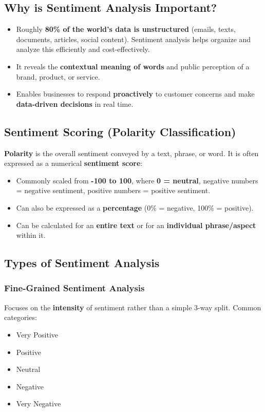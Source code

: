 \documentclass[12pt,openany]{book}
\begin{document}
\subsection{Why is Sentiment Analysis Important?}

\begin{itemize}[leftmargin=*]
    \item Roughly \textbf{80\% of the world's data is unstructured} (emails, texts, documents, articles, social content). Sentiment analysis helps organize and analyze this efficiently and cost-effectively.
    \item It reveals the \textbf{contextual meaning of words} and public perception of a brand, product, or service.
    \item Enables businesses to respond \textbf{proactively} to customer concerns and make \textbf{data-driven decisions} in real time.
\end{itemize}

\subsection{Sentiment Scoring (Polarity Classification)}

\textbf{Polarity} is the overall sentiment conveyed by a text, phrase, or word. It is often expressed as a numerical \textbf{sentiment score}:
\begin{itemize}[leftmargin=*]
    \item Commonly scaled from \textbf{-100 to 100}, where \textbf{0 = neutral}, negative numbers = negative sentiment, positive numbers = positive sentiment.
    \item Can also be expressed as a \textbf{percentage} (0\% = negative, 100\% = positive).
    \item Can be calculated for an \textbf{entire text} or for an \textbf{individual phrase/aspect} within it.
\end{itemize}

\subsection{Types of Sentiment Analysis}

\subsubsection{Fine-Grained Sentiment Analysis}

Focuses on the \textbf{intensity} of sentiment rather than a simple 3-way split. Common categories:
\begin{itemize}[leftmargin=*]
    \item Very Positive
    \item Positive
    \item Neutral
    \item Negative
    \item Very Negative
\end{itemize}
\end{document}
